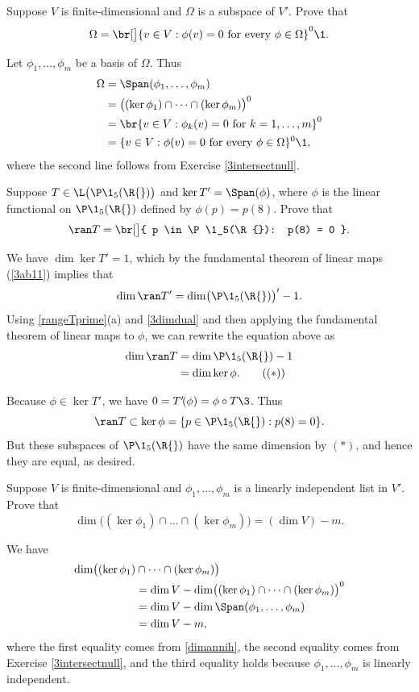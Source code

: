 \exercise
Suppose $V$ is finite-dimensional and $\Omega$ is a subspace of $V'\!$. Prove that
\[
\Omega = \br[\big]{v \in V: \phi(v) = 0 \text{\ for every } \phi \in \Omega}^0\1.
\]
\exercisedisplayend

\begin{Solution}
Let $\phi_1, \ldots, \phi_m$ be a basis of $\Omega$. Thus
\begin{align*}
\Omega &= \Span(\phi_1, \dots, \phi_m) \\
&= \bigl( (\ker \phi_1) \cap \dots \cap (\ker \phi_m)\bigr)^0 \\
&= \br{ v \in V: \phi_k(v) = 0 \text{ for } k = 1, \ldots, m}^0 \\
&= \{v \in V: \phi(v) = 0 \text{ for every } \phi \in \Omega\}^0\1,
 \end{align*}
 where the second line follows from Exercise \ref{3intersectnull}.
\end{Solution}

 \exercise
Suppose $T \in \L\bigl( \P\1_5(\R{}) \bigr)$ and $\ker T' = \Span(\phi)$, where $\phi$ is the linear functional on $\P\1_5(\R{})$ defined by $\phi(p) = p(8)$. Prove that
\[
\ran T = \br[\big]{ p \in \P\1_5(\R{}): p(8) = 0 }.
\]
\exercisedisplayend

\begin{Solution}
We have $\dim \ker T' = 1$, which by the fundamental theorem of linear maps (\ref{3ab11}) implies that
\[
\dim \ran T' = \dim \bigl( \P\1_5(\R{}) \bigr)' - 1.
\]
Using \ref{rangeTprime}(a) and \ref{3dimdual} and then applying the fundamental theorem of linear maps to $\phi$, we can rewrite the equation above as
\begin{align*}
\dim \ran T &= \dim \P\1_5(\R{}) - 1 \notag\\
&= \dim \ker \phi. \tag{$(*)$}
\end{align*}

Because $\phi \in \ker T'$, we have $0 = T' \! (\phi) = \phi \circ T\3$. Thus
\[
\ran T \subset \ker \phi = \{p \in \P\1_5(\R{}): p(8) = 0 \}.
\]
But these subspaces of $\P\1_5(\R{})$ have the same dimension by $(*)$, and hence they are equal, as desired.
\end{Solution}

\exercise
Suppose $V$ is finite-dimensional and $\phi_1, \dots, \phi_m$ is a linearly independent list in $V'\!$. Prove that \label{intker}
\[
\dim \bigl( (\ker \phi_1) \cap \dots \cap (\ker \phi_m)\bigr) = (\dim V) - m.
\]
\exercisedisplayend

\begin{Solution}
We have
\begin{align*}
\dim \bigl( (\ker \phi_1) &\cap \dots \cap (\ker \phi_m)\bigr) \\
&= \dim V - \dim \bigl( (\ker \phi_1) \cap \dots \cap (\ker \phi_m)\bigr)^0 \\
&= \dim V - \dim \Span(\phi_1, \dots, \phi_m) \\
&= \dim V - m,
\end{align*}
where the first equality comes from \ref{dimannih}, the second equality comes from Exercise \ref{3intersectnull}, and the third equality holds because $\phi_1, \dots, \phi_m$ is linearly independent.
\end{Solution}

